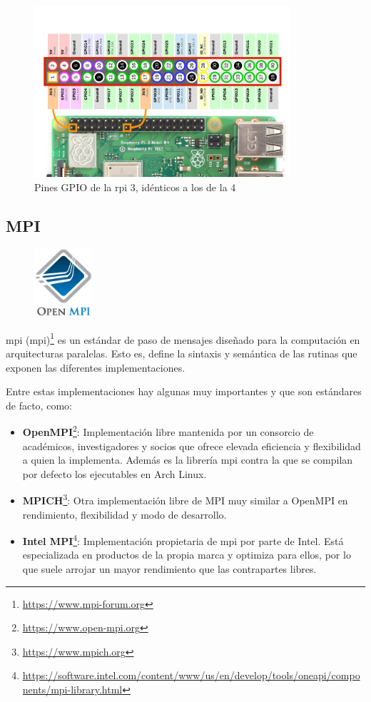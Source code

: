 \begin{figure}[h!]
  \centering
  \includegraphics[width=0.85\textwidth]{img/rpi_parts/rpi_gpio.png}
  \caption{Pines GPIO de la \acrlong{rpi} 3, idénticos a los de la 4}
  \label{fig:rpi_gpio_pinout}
\end{figure}

\subsection{MPI}
\begin{figure}
  \centering
  \includegraphics[width=0.19\textwidth]{img/ompi_logo_2.png}
  \label{fig:ompi_logo}
\end{figure} 

\acrshort{mpi} (\acrlong{mpi})\footnote{\url{https://www.mpi-forum.org}} es un estándar de paso de mensajes diseñado para la computación en arquitecturas paralelas. Esto es, define la sintaxis y semántica de las rutinas que exponen las diferentes implementaciones.

Entre estas implementaciones hay algunas muy importantes y que son estándares de facto, como:
\begin{itemize}
  \item\textbf{OpenMPI}\footnote{\url{https://www.open-mpi.org}}: Implementación libre mantenida por un consorcio de académicos, investigadores y socios que ofrece elevada eficiencia y flexibilidad a quien la implementa. Además es la librería \acrshort{mpi} contra la que se compilan por defecto los ejecutables en Arch Linux.
  \item\textbf{MPICH}\footnote{\url{https://www.mpich.org}}: Otra implementación libre de MPI muy similar a OpenMPI en rendimiento, flexibilidad y modo de desarrollo.
  \item\textbf{Intel MPI}\footnote{\url{https://software.intel.com/content/www/us/en/develop/tools/oneapi/components/mpi-library.html}}: Implementación propietaria de \acrshort{mpi} por parte de Intel. Está especializada en productos de la propia marca y optimiza para ellos, por lo que suele arrojar un mayor rendimiento que las contrapartes libres.
\end{itemize}

